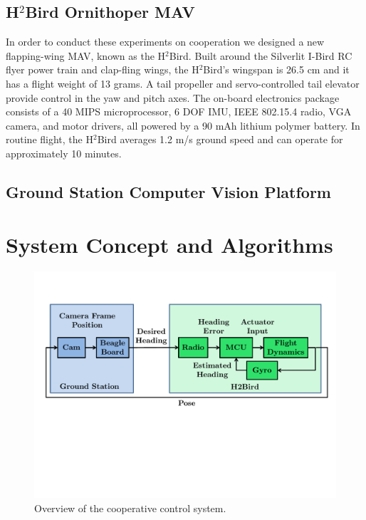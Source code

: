 \documentclass{aamas2013}
\begin{document}
\subsection{H$^2$Bird Ornithoper MAV}
In order to conduct these experiments on cooperation we designed a new
flapping-wing MAV, known as the H$^2$Bird. Built around the Silverlit I-Bird 
RC flyer power train and clap-fling wings, the H$^2$Bird's wingspan is 26.5 
cm and it has a flight weight of 13 grams. A tail propeller and 
servo-controlled tail elevator provide control in the yaw and pitch axes. The 
on-board electronics package consists of a 40 MIPS microprocessor, 6 DOF IMU, 
IEEE 802.15.4 radio, VGA camera, and motor drivers, all powered by a 90 mAh 
lithium polymer battery. In routine flight, the H$^2$Bird averages 1.2 m/s 
ground speed and can operate for approximately 10 minutes.

\subsection{Ground Station Computer Vision Platform}


\section{System Concept and Algorithms}

\begin{figure}[tb]
\centering
\includegraphics[width=\linewidth]{figures/process_flow.pdf}
\caption{Overview of the cooperative control system.}
\label{fig:process_flow}
\end{figure}
\end{document}
